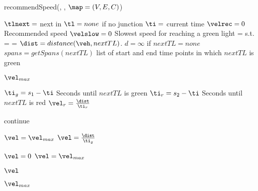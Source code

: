 \begin{algorithm}
\caption{recommendSpeed(\veh, \route, $\map = (V, E, C)$)}\label{alg.recommendedSpeed}
\begin{algorithmic}[1]
\State $\tlnext= $ next \tl in \route\Comment $\tl=none$ if no junction \label{alg:recSpeed:initStart}
\State $\ti=$ current time
\State $\velrec = 0$ \Comment Recommended speed
\State $\velslow = 0$ \Comment Slowest speed for reaching a green light
\State \velmax = \espeed s.t. \eend=\vehposstart
\Else
\State \velmax = \vehposspeed
\EndIf
\State $\dist=distance(\veh,nextTL)$. \Comment $d=\infty$ if $nextTL=none$\label{alg:recSpeed:initEnd}
\State $spans = getSpans(nextTL)$ \Comment list of start and end time points in which $nextTL$ is green

\Return $\vel_{max}$ \label{alg:recSpeed:maxSpeed}
\EndIf

\label{alg:recSpeed:loopSpans}
\State $\ti_g = s_1 - \ti$ \Comment Seconds until $nextTL$ is green \label{alg:recSpeed:tg}
\State $\ti_r = s_2 - \ti$ \Comment Seconds until $nextTL$ is red\label{alg:recSpeed:tr}
\State $\vel_r = \frac{\dist}{\ti_r}$\label{alg:recSpeed:hr}

\label{alg:recSpeed:continue}
\State continue
\EndIf

\label{alg:recSpeed:green}
\State $\vel=\vel_{max}$
\Else
\State $\vel = \frac{\dist}{\ti_g}$\label{alg:recSpeed:h}
\EndIf

\label{alg:recSpeed:h0} %
\State $\vel = 0$
\State $\vel=\vel_{max}$
\EndIf\label{alg:recSpeed:hmax}

\State\Return $\vel$\label{alg:recSpeed:returnh}
\EndFor

\State\Return $\vel_{max}$\label{alg:recSpeed:returnmax}

\end{algorithmic}
\end{algorithm}